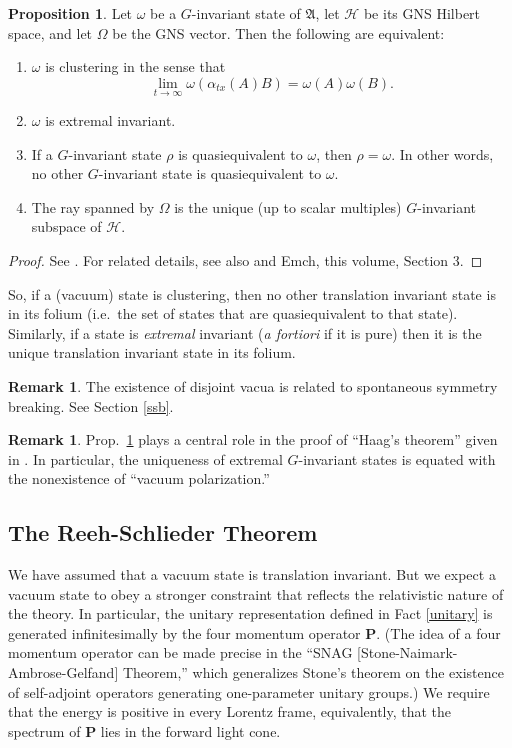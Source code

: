 \documentclass[11pt]{article}
\newcommand{\alg}[1]{\mathfrak{#1}}
\theoremstyle{definition}
\newtheorem{prop}[thm]{Proposition}
\theoremstyle{definition}
\newtheorem{note}[thm]{Remark}
\theoremstyle{remark}
\def\2#1{{\mathcal #1}}
\def\a{\alpha} \def\b{\beta} \def\g{\gamma} \def\d{\delta}
\def\om{\omega} \def\Om{\Omega} \def\dd{\partial} \def\D{\Delta}
\begin{document}
\begin{prop} Let $\om$ be a $G$-invariant state of $\alg{A}$, let $\2H$ be its GNS
  Hilbert space, and let $\Om$ be the GNS vector.  Then the following are equivalent:
\begin{enumerate}
\item $\om$ is clustering in the sense that
$$ \lim _{t\to \infty }\om (\a _{tx}(A)B)=\om (A)\om (B) .$$
\item $\om$ is extremal invariant.
\item If a $G$-invariant state $\rho$ is quasiequivalent to $\om$,
  then $\rho =\om$.  In other words, no other $G$-invariant state is
  quasiequivalent to $\om$.
\item The ray spanned by $\Om$ is the unique (up to scalar multiples) $G$-invariant
  subspace of $\2H$.
\end{enumerate} \label{G-inv}
\end{prop}

\begin{proof} See \cite{storm}.  For related details,
  see also \cite[pp.\ 183, 287]{emch} and Emch, this
  volume, Section 3.
\end{proof}

So, if a (vacuum) state is clustering, then no other translation
invariant state is in its folium (i.e.\ the set of states that are
quasiequivalent to that state).  Similarly, if a state is
\emph{extremal} invariant (\emph{a fortiori} if it is pure) then it is
the unique translation invariant state in its folium.

\begin{note} The existence of disjoint vacua is related to spontaneous
  symmetry breaking.  See Section \ref{ssb}.  \end{note}

\begin{note} Prop.\ \ref{G-inv} plays a central role in the proof of
  ``Haag's theorem'' given in \cite[p.\ 248]{emch}.  In particular,
  the uniqueness of extremal $G$-invariant states is equated with the
  nonexistence of ``vacuum polarization.''
\end{note}


\subsection{The Reeh-Schlieder Theorem} \label{rst}

We have assumed that a vacuum state is translation invariant.  But we
expect a vacuum state to obey a stronger constraint that reflects the
relativistic nature of the theory.  In particular, the unitary
representation defined in Fact \ref{unitary} is generated
infinitesimally by the four momentum operator $\mathbf{P}$.  (The idea
of a four momentum operator can be made precise in the ``SNAG
[Stone-Naimark-Ambrose-Gelfand] Theorem,'' which generalizes Stone's
theorem on the existence of self-adjoint operators generating
one-parameter unitary groups.)  We require that the energy is positive
in every Lorentz frame, equivalently, that the spectrum of
$\mathbf{P}$ lies in the forward light cone.
\end{document}
